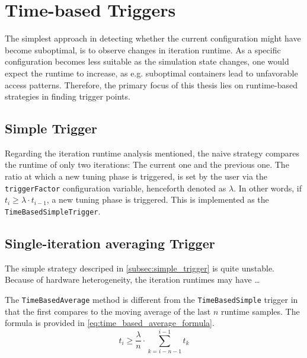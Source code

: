 \section{Time-based Triggers}

The simplest approach in detecting whether the current configuration might have become suboptimal, is to observe changes in iteration runtime. As a specific configuration becomes less suitable as the simulation state changes, one would expect the runtime to increase, as e.g. suboptimal containers lead to unfavorable access patterns. Therefore, the primary focus of this thesis lies on runtime-based strategies in finding trigger points.

\subsection{Simple Trigger}
\label{subsec:simple_trigger}
Regarding the iteration runtime analysis mentioned, the naive strategy compares the runtime of only two iterations: The current one and the previous one. The ratio at which a new tuning phase is triggered, is set by the user via the \texttt{triggerFactor} configuration variable, henceforth denoted as $\lambda$. In other words, if $t_i \ge \lambda\cdot t_{i-1}$, a new tuning phase is triggered. This is implemented as the \texttt{TimeBasedSimpleTrigger}.


\subsection{Single-iteration averaging Trigger}
The simple strategy descriped in \autoref{subsec:simple_trigger} is quite unstable. Because of hardware heterogeneity, the iteration runtimes may have …\textellipsis %

The \texttt{TimeBasedAverage} method is different from the \texttt{TimeBasedSimple} trigger in that the first compares to the  moving average of the last $n$ runtime samples. The formula is provided in \eqref{eq:time_based_average_formula}.
\begin{equation}
	t_i \ge \frac{\lambda}{n}\cdot \sum_{k=i-n-1}^{i-1}t_{k}\label{eq:time_based_average_formula}
\end{equation}


